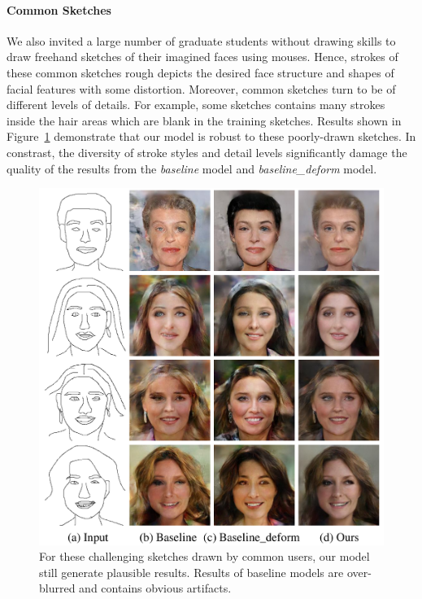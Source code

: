 \paragraph{Common Sketches}
We also invited a large number of graduate students without drawing skills to draw freehand sketches of their imagined faces using mouses. Hence, strokes of these common sketches rough depicts the desired face structure and shapes of facial features with some distortion. 
Moreover, common sketches turn to be of different levels of details. For example, some sketches contains many strokes inside the hair areas which are blank in the training sketches. 
%
Results shown in Figure~\ref{fig:common_sketches} demonstrate that our model is robust to these poorly-drawn sketches. 
In constrast, the diversity of stroke styles and detail levels significantly damage the quality of the results from the \textit{baseline} model and \textit{baseline\_deform} model.


\begin{figure}
	\includegraphics[width=0.9\linewidth]{figs/commonsketches}
	\caption{For these challenging sketches drawn by common users, our model still generate plausible results. Results of baseline models are over-blurred and contains obvious artifacts.}
	\label{fig:common_sketches}
\end{figure}

